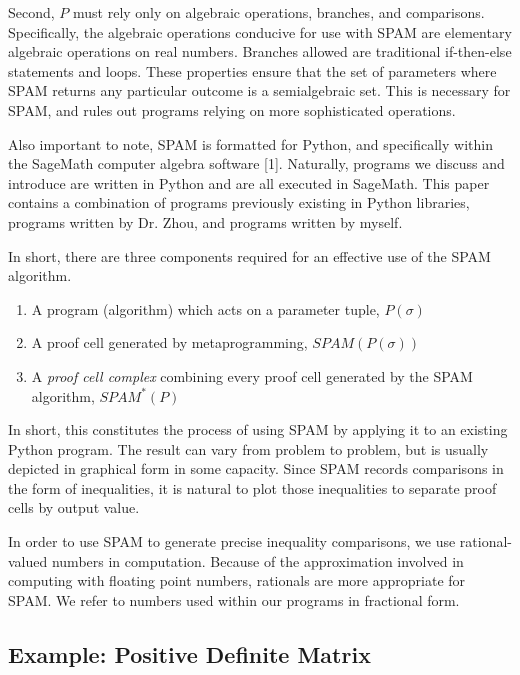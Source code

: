 \documentclass{article}
\begin{document}
Second, $P$ must rely only on algebraic operations, branches, and comparisons. Specifically, the algebraic operations conducive for use with SPAM are elementary algebraic operations on real numbers. Branches allowed are traditional if-then-else statements and loops. These properties ensure that the set of parameters where SPAM returns any particular outcome is a semialgebraic set. This is necessary for SPAM, and rules out programs relying on more sophisticated operations. 

Also important to note, SPAM is formatted for Python, and specifically within the SageMath computer algebra software [1]. Naturally, programs we discuss and introduce are written in Python and are all executed in SageMath. This paper contains a combination of programs previously existing in Python libraries, programs written by Dr. Zhou, and programs written by myself. 

In short, there are three components required for an effective use of the SPAM algorithm.
\begin{enumerate}
    \item A program (algorithm) which acts on a parameter tuple, $P(\sigma)$
    \item A proof cell generated by metaprogramming, $SPAM(P(\sigma))$
    \item A \textit{proof cell complex} combining every proof cell generated by the SPAM algorithm, $SPAM^*(P)$
\end{enumerate}

In short, this constitutes the process of using SPAM by applying it to an existing Python program. The result can vary from problem to problem, but is usually depicted in graphical form in some capacity. Since SPAM records comparisons in the form of inequalities, it is natural to plot those inequalities to separate proof cells by output value. 

\begin{notes}
\item In order to use SPAM to generate precise inequality comparisons, we use rational-valued numbers in computation. Because of the approximation involved in computing with floating point numbers, rationals are more appropriate for SPAM. We refer to numbers used within our programs in fractional form.
\end{notes}

\subsection{Example: Positive Definite Matrix}
\end{document}
